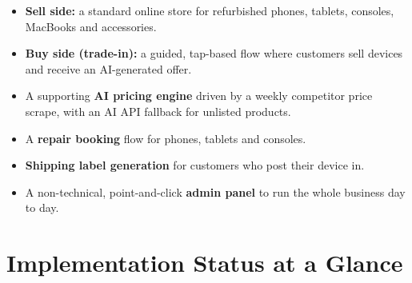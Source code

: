\documentclass[11pt,a4paper]{article}
\begin{document}
\begin{itemize}
  \item \textbf{Sell side:} a standard online store for refurbished phones, tablets, consoles, MacBooks and accessories.
  \item \textbf{Buy side (trade-in):} a guided, tap-based flow where customers sell devices and receive an AI-generated offer.
  \item A supporting \textbf{AI pricing engine} driven by a weekly competitor price scrape, with an AI API fallback for unlisted products.
  \item A \textbf{repair booking} flow for phones, tablets and consoles.
  \item \textbf{Shipping label generation} for customers who post their device in.
  \item A non-technical, point-and-click \textbf{admin panel} to run the whole business day to day.
\end{itemize}

\section{Implementation Status at a Glance}
\end{document}
